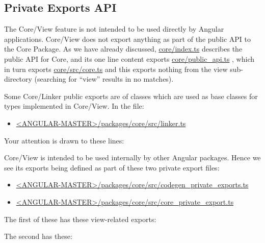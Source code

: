 \subsection{Private Exports API}

The Core/View feature is not intended to be used directly by Angular applications.
Core/View does not export anything as part of the public API to the Core Package. As
we have already discussed,
\url{core/index.ts}
describes the public API for Core, and its
one line content exports
\url{core/public_api.ts}
, which in turn exports
\url{core/src/core.ts}
and
this exports nothing from the view sub-directory (searching for “view” results in no
matches).

Some Core/Linker public exports are of classes which are used as base classes for
types implemented in Core/View. In the file:

\begin{itemize}
  \item \href{https://github.com/angular/angular/blob/master/packages/core/src/linker.ts}
        {<ANGULAR-MASTER>/packages/core/src/linker.ts}
\end{itemize}

Your attention is drawn to these lines:



Core/View is intended to be used internally by other Angular packages. Hence we see
its exports being defined as part of these two private export files:

\begin{itemize}
  \item \href{https://github.com/angular/angular/blob/master/packages/core/src/codegen_private_exports.ts}
        {<ANGULAR-MASTER>/packages/core/src/codegen\_private\_exports.ts}
  \item \href{https://github.com/angular/angular/blob/master/packages/core/src/core_private_export.ts}
        {<ANGULAR-MASTER>/packages/core/src/core\_private\_export.ts}
\end{itemize}

The first of these has these view-related exports:



The second has these:



